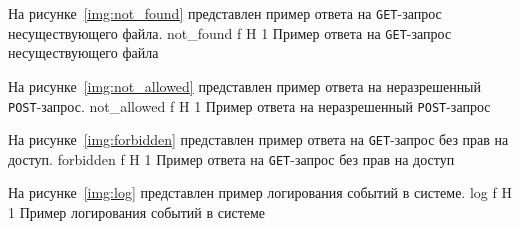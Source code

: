 На рисунке~\ref{img:not_found} представлен пример ответа на \texttt{GET}-запрос несуществующего файла.
	{not_found}
	{f}
	{H}
	{1\textwidth}
	{Пример ответа на \texttt{GET}-запрос несуществующего файла}

На рисунке~\ref{img:not_allowed} представлен пример ответа на неразрешенный \texttt{POST}-запрос.
	{not_allowed}
	{f}
	{H}
	{1\textwidth}
	{Пример ответа на неразрешенный \texttt{POST}-запрос}

\clearpage
На рисунке~\ref{img:forbidden} представлен пример ответа на \texttt{GET}-запрос без прав на доступ.
	{forbidden}
	{f}
	{H}
	{1\textwidth}
	{Пример ответа на \texttt{GET}-запрос без прав на доступ}

На рисунке~\ref{img:log} представлен пример логирования событий в системе.
	{log}
	{f}
	{H}
	{1\textwidth}
	{Пример логирования событий в системе}
